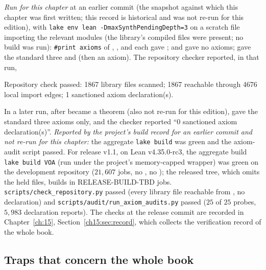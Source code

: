 \emph{Run for this chapter} at an earlier commit (the snapshot against which this chapter was
first written; this record is historical and was not re-run for this edition), with
\texttt{lake env lean -DmaxSynthPendingDepth=3} on a scratch file importing the relevant modules
(the library's compiled files were present; no build was run):
\texttt{\#print axioms} of , ,
 and  each gave
;  and  gave no
axioms;  gave the standard three and  (then an axiom). The
repository checker reported, in that run,
\begin{plaincode}
Repository check passed: 1867 library files scanned; 1867 reachable through 4676 local import edges; 1 sanctioned axiom declaration(s).
\end{plaincode}
In a later run, after  became a theorem (also not re-run for this edition),
 gave the standard three axioms only, and the checker reported
``0 sanctioned axiom declaration(s)''.
\emph{Reported by the project's build record for an earlier commit and not re-run for this chapter:}
the aggregate \texttt{lake build} was green and the axiom-audit script passed. For release v1.1, on Lean v4.35.0-rc3,
the aggregate build \texttt{lake build VOA} (run under the project's memory-capped wrapper) was green on the development
repository ($21{,}607$ jobs, no , no ); the released tree, which omits the held files, builds
in RELEASE-BUILD-TBD jobs. \texttt{scripts/check\_repository.py} passed (every library file reachable from
, no  declaration) and \texttt{scripts/audit/run\_axiom\_audits.py} passed ($25$ of $25$ probes,
$5{,}983$ declaration reports). The checks at the release commit are recorded in Chapter~\ref{ch:15}, Section~\ref{ch15:sec:record}, which collects the
verification record of the whole book.

\subsection{Traps that concern the whole book}\label{ch01:sec:traps}

